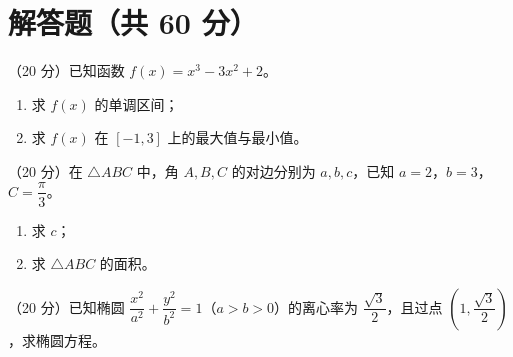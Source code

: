 \documentclass{exam-zh}
\begin{document}
\section{解答题（共 60 分）}
\begin{problem}
（20 分）已知函数 $f(x)=x^3-3x^2+2$。
\begin{enumerate}
\item 求 $f(x)$ 的单调区间；
\item 求 $f(x)$ 在 $[-1,3]$ 上的最大值与最小值。
\end{enumerate}
\end{problem}
\begin{problem}
（20 分）在 $\triangle ABC$ 中，角 $A,B,C$ 的对边分别为 $a,b,c$，已知 $a=2$，$b=3$，$C=\dfrac{\pi}{3}$。
\begin{enumerate}
\item 求 $c$；
\item 求 $\triangle ABC$ 的面积。
\end{enumerate}
\end{problem}
\begin{problem}
（20 分）已知椭圆 $\dfrac{x^2}{a^2}+\dfrac{y^2}{b^2}=1$（$a>b>0$）的离心率为 $\dfrac{\sqrt3}{2}$，且过点 $\left(1,\dfrac{\sqrt3}{2}\right)$，求椭圆方程。
\end{problem}
\end{document}
